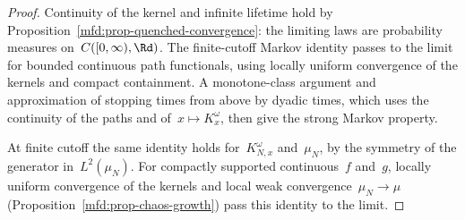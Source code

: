 \documentclass[11pt]{amsart}
\begin{document}
\begin{proof}
Continuity of the kernel and infinite lifetime hold by Proposition~\ref{mfd:prop-quenched-convergence}: the limiting laws are probability measures on~$C([0,\infty),\Rd)$. The finite-cutoff Markov identity passes to the limit for bounded continuous path functionals, using locally uniform convergence of the kernels and compact containment. A monotone-class argument and approximation of stopping times from above by dyadic times, which uses the continuity of the paths and of~$x\mapsto K^\omega_x$, then give the strong Markov property.

\smallskip

At finite cutoff the same identity holds for~$K^\omega_{N,x}$ and~$\mu_N$, by the symmetry of the generator in~$L^2(\mu_N)$. For compactly supported continuous~$f$ and~$g$, locally uniform convergence of the kernels and local weak convergence~$\mu_N\to\mu$ (Proposition~\ref{mfd:prop-chaos-growth}) pass this identity to the limit.
\end{proof}
\end{document}
